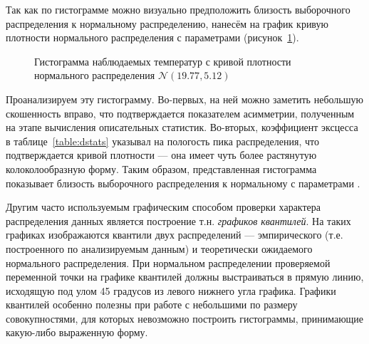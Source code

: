 Так как по гистограмме можно визуально предположить близость выборочного распределения к нормальному распределению, нанесём на график кривую плотности нормального распределения с параметрами \normaldistr(рисунок~\ref{img:histogram_fitted}).
\begin{figure}[ht]
\caption{Гистограмма наблюдаемых температур с кривой плотности нормального распределения $\mathcal{N}(19.77, 5.12)$}
\label{img:histogram_fitted}
\end{figure}
Проанализируем эту гистограмму. Во-первых, на ней можно заметить небольшую скошенность вправо, что подтверждается показателем асимметрии, полученным на этапе вычисления описательных статистик. Во-вторых, коэффициент эксцесса в таблице~\ref{table:dstats} указывал на пологость пика распределения, что подтверждается кривой плотности --- она имеет чуть более растянутую колоколообразную форму. Таким образом, представленная гистограмма показывает близость выборочного распределения к нормальному с параметрами \normaldistr.

Другим часто используемым графическим способом проверки характера распределения данных является построение т.н. \textit{графиков квантилей}. На таких графиках изображаются квантили двух распределений --- эмпирического (т.е. построенного по анализируемым данным) и теоретически ожидаемого нормального распределения. При нормальном распределении проверяемой переменной точки на графике квантилей должны выстраиваться в прямую линию, исходящую под улом 45 градусов из левого нижнего угла графика. Графики квантилей особенно полезны при работе с небольшими по размеру совокупностями, для которых невозможно построить гистограммы, принимающие какую-либо выраженную форму.

